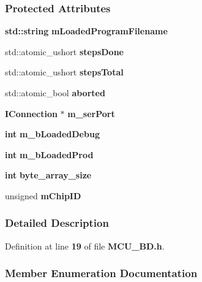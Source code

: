 \subsubsection*{Protected Attributes}
\begin{DoxyCompactItemize}
\item 
{\bf std\+::string} {\bf m\+Loaded\+Program\+Filename}
\item 
std\+::atomic\+\_\+ushort {\bf steps\+Done}
\item 
std\+::atomic\+\_\+ushort {\bf steps\+Total}
\item 
std\+::atomic\+\_\+bool {\bf aborted}
\item 
{\bf I\+Connection} $\ast$ {\bf m\+\_\+ser\+Port}
\item 
{\bf int} {\bf m\+\_\+b\+Loaded\+Debug}
\item 
{\bf int} {\bf m\+\_\+b\+Loaded\+Prod}
\item 
{\bf int} {\bf byte\+\_\+array\+\_\+size}
\item 
unsigned {\bf m\+Chip\+ID}
\end{DoxyCompactItemize}


\subsubsection{Detailed Description}


Definition at line {\bf 19} of file {\bf M\+C\+U\+\_\+\+B\+D.\+h}.



\subsubsection{Member Enumeration Documentation}
